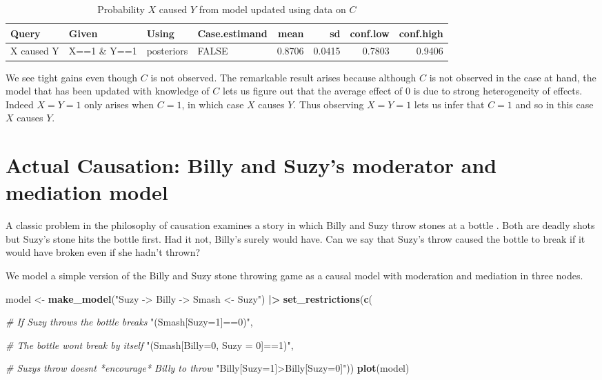 \documentclass[
  12pt,
]{book}
\newenvironment{Shaded}{\begin{snugshade}}{\end{snugshade}}
\newcommand{\CommentTok}[1]{\textcolor[rgb]{0.56,0.35,0.01}{\textit{#1}}}
\newcommand{\FunctionTok}[1]{\textcolor[rgb]{0.13,0.29,0.53}{\textbf{#1}}}
\newcommand{\NormalTok}[1]{#1}
\newcommand{\OtherTok}[1]{\textcolor[rgb]{0.56,0.35,0.01}{#1}}
\newcommand{\SpecialCharTok}[1]{\textcolor[rgb]{0.81,0.36,0.00}{\textbf{#1}}}
\newcommand{\StringTok}[1]{\textcolor[rgb]{0.31,0.60,0.02}{#1}}
\begin{document}
\begin{table}

\caption{\label{tab:unnamed-chunk-82}Probability $X$ caused $Y$ from model updated using data on $C$}
\centering
\begin{tabular}[t]{l|l|l|l|r|r|r|r}
\hline
Query & Given & Using & Case.estimand & mean & sd & conf.low & conf.high\\
\hline
X caused Y & X==1 \& Y==1 & posteriors & FALSE & 0.8706 & 0.0415 & 0.7803 & 0.9406\\
\hline
\end{tabular}
\end{table}

We see tight gains even though \(C\) is not observed. The remarkable result arises because although \(C\) is not observed in the case at hand, the model that has been updated with knowledge of \(C\) lets us figure out that the average effect of 0 is due to strong heterogeneity of effects. Indeed \(X=Y=1\) only arises when \(C=1\), in which case \(X\) causes \(Y\). Thus observing \(X=Y=1\) lets us infer that \(C=1\) and so in this case \(X\) causes \(Y\).

\hypertarget{Billy}{%
\section{Actual Causation: Billy and Suzy's moderator and mediation model}\label{Billy}}

A classic problem in the philosophy of causation examines a story in which Billy and Suzy throw stones at a bottle \citep{hall2004two}. Both are deadly shots but Suzy's stone hits the bottle first. Had it not, Billy's surely would have. Can we say that Suzy's throw caused the bottle to break if it would have broken even if she hadn't thrown?

We model a simple version of the Billy and Suzy stone throwing game as a causal model with moderation and mediation in three nodes.

\begin{Shaded}
\begin{Highlighting}[]
\NormalTok{model }\OtherTok{\textless{}{-}} \FunctionTok{make\_model}\NormalTok{(}\StringTok{"Suzy {-}\textgreater{} Billy {-}\textgreater{} Smash \textless{}{-} Suzy"}\NormalTok{) }\SpecialCharTok{|\textgreater{}}
         \FunctionTok{set\_restrictions}\NormalTok{(}\FunctionTok{c}\NormalTok{(}
           
           \CommentTok{\# If Suzy throws the bottle breaks}
           \StringTok{"(Smash[Suzy=1]==0)"}\NormalTok{,}

           \CommentTok{\# The bottle won\textquotesingle{}t break by itself}
           \StringTok{"(Smash[Billy=0, Suzy = 0]==1)"}\NormalTok{,}
           
           \CommentTok{\# Suzy\textquotesingle{}s throw doesn\textquotesingle{}t *encourage* Billy to throw}
           \StringTok{"Billy[Suzy=1]\textgreater{}Billy[Suzy=0]"}\NormalTok{))}
\FunctionTok{plot}\NormalTok{(model)}
\end{Highlighting}
\end{Shaded}
\end{document}
